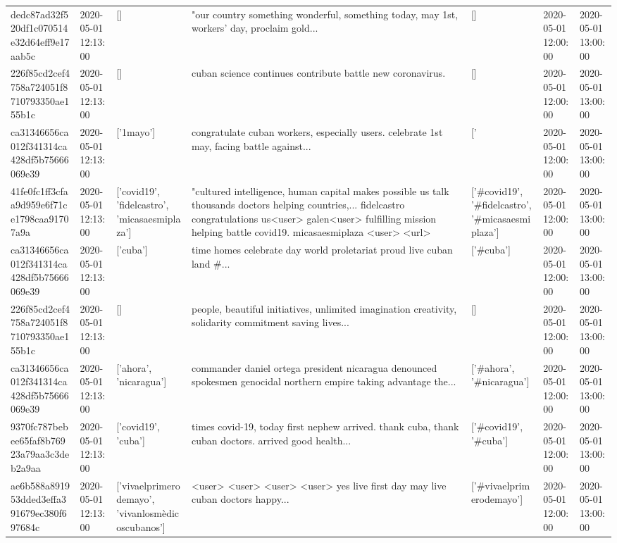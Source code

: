 \begin{tabular}{lllllll}
dedc87ad32f520df1c070514e32d64eff9e17aab5c & 2020-05-01 12:13:00 & [] & "our country something wonderful, something today, may 1st, workers' day, proclaim gold... & [] & 2020-05-01 12:00:00 & 2020-05-01 13:00:00 \\
226f85cd2cef4758a724051f8710793350ae155b1c & 2020-05-01 12:13:00 & [] & cuban science continues contribute battle new coronavirus. & [] & 2020-05-01 12:00:00 & 2020-05-01 13:00:00 \\
ca31346656ca012f341314ca428df5b75666069e39 & 2020-05-01 12:13:00 & ['1mayo'] & congratulate cuban workers, especially users. celebrate 1st may, facing battle against... & ['#1mayo'] & 2020-05-01 12:00:00 & 2020-05-01 13:00:00 \\
41fe0fc1ff3cfaa9d959e6f71ce1798caa91707a9a & 2020-05-01 12:13:00 & ['covid19', 'fidelcastro', 'micasaesmiplaza'] & "cultured intelligence, human capital makes possible us talk thousands doctors helping countries,... fidelcastro congratulations us<user> galen<user> fulfilling mission helping battle covid19. micasaesmiplaza <user> <url> & ['#covid19', '#fidelcastro', '#micasaesmiplaza'] & 2020-05-01 12:00:00 & 2020-05-01 13:00:00 \\
ca31346656ca012f341314ca428df5b75666069e39 & 2020-05-01 12:13:00 & ['cuba'] & time homes celebrate day world proletariat proud live cuban land \#... & ['#cuba'] & 2020-05-01 12:00:00 & 2020-05-01 13:00:00 \\
226f85cd2cef4758a724051f8710793350ae155b1c & 2020-05-01 12:13:00 & [] & people, beautiful initiatives, unlimited imagination creativity, solidarity commitment saving lives... & [] & 2020-05-01 12:00:00 & 2020-05-01 13:00:00 \\
ca31346656ca012f341314ca428df5b75666069e39 & 2020-05-01 12:13:00 & ['ahora', 'nicaragua'] & commander daniel ortega president nicaragua denounced spokesmen genocidal northern empire taking advantage the... & ['#ahora', '#nicaragua'] & 2020-05-01 12:00:00 & 2020-05-01 13:00:00 \\
9370fc787bebee65faf8b76923a79aa3c3deb2a9aa & 2020-05-01 12:13:00 & ['covid19', 'cuba'] & times covid-19, today first nephew arrived. thank cuba, thank cuban doctors. arrived good health... & ['#covid19', '#cuba'] & 2020-05-01 12:00:00 & 2020-05-01 13:00:00 \\
ae6b588a891953dded3effa391679ec380f697684c & 2020-05-01 12:13:00 & ['vivaelprimerodemayo', 'vivanlosmèdicoscubanos'] & <user> <user> <user> <user> yes live first day may live cuban doctors happy... & ['#vivaelprimerodemayo'] & 2020-05-01 12:00:00 & 2020-05-01 13:00:00 \\

\end{tabular}
